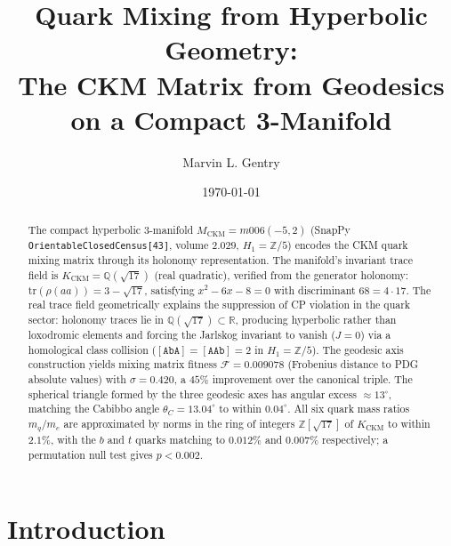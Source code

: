 \documentclass[11pt,a4paper]{article}
\begin{document}
\title{Quark Mixing from Hyperbolic Geometry:\\
The CKM Matrix from Geodesics on a Compact 3-Manifold}

\author[1]{Marvin L. Gentry}
\date{\today}


\begin{abstract}
The compact hyperbolic 3-manifold $M_{\mathrm{CKM}} = m006(-5,2)$
(SnapPy \texttt{OrientableClosedCensus[43]}, volume $2.029$,
$H_1=\mathbb{Z}/5$) encodes the CKM quark mixing matrix through its
holonomy representation. The manifold's invariant trace field is
$K_{\mathrm{CKM}}=\mathbb{Q}(\sqrt{17})$ (real quadratic), verified
from the generator holonomy: $\mathrm{tr}(\rho(aa))=3-\sqrt{17}$,
satisfying $x^2-6x-8=0$ with discriminant $68=4\cdot17$.
The real trace field geometrically explains the suppression of CP
violation in the quark sector: holonomy traces lie in
$\mathbb{Q}(\sqrt{17})\subset\mathbb{R}$, producing hyperbolic rather
than loxodromic elements and forcing the Jarlskog invariant to vanish
($J=0$) via a homological class collision
($[\texttt{AbA}]=[\texttt{AAb}]=2$ in $H_1=\mathbb{Z}/5$).
The geodesic axis construction yields mixing matrix fitness
$\mathcal{F}=0.009078$ (Frobenius distance to PDG absolute values)
with $\sigma=0.420$, a $45\%$ improvement over the canonical triple.
The spherical triangle formed by the three geodesic axes has angular
excess $\approx13^\circ$, matching the Cabibbo angle
$\theta_C=13.04^\circ$ to within $0.04^\circ$.
All six quark mass ratios $m_q/m_e$ are approximated by norms in the
ring of integers $\mathbb{Z}[\sqrt{17}]$ of $K_{\mathrm{CKM}}$
to within $2.1\%$, with the $b$ and $t$ quarks matching to $0.012\%$
and $0.007\%$ respectively; a permutation null test gives $p<0.002$.
\end{abstract}

\maketitle

\section{Introduction}
\label{sec:intro}
\end{document}
